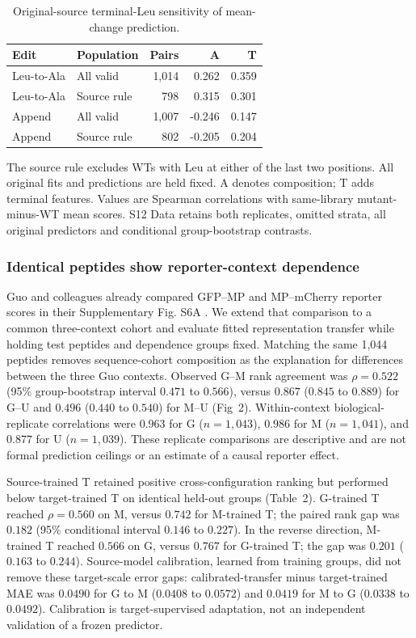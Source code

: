 \documentclass[11pt,a4paper]{article}
\begin{document}
\begin{table}[H]
\centering\small
\caption{Original-source terminal-Leu sensitivity of mean-change prediction.}
\label{tab:sourcefilter}
\begin{tabular}{llrrr}
\toprule
Edit & Population & Pairs & A & T\\
\midrule
Leu-to-Ala & All valid & 1,014 & 0.262 & 0.359\\
Leu-to-Ala & Source rule & 798 & 0.315 & 0.301\\
Append & All valid & 1,007 & -0.246 & 0.147\\
Append & Source rule & 802 & -0.205 & 0.204\\
\bottomrule
\end{tabular}
\par\smallskip\raggedright\footnotesize
The source rule excludes WTs with Leu at either of the last two positions.
All original fits and predictions are held fixed. A denotes composition;
T adds terminal features. Values are Spearman correlations with same-library
mutant-minus-WT mean scores. S12 Data retains both replicates, omitted strata,
all original predictors and conditional group-bootstrap contrasts.
\end{table}

\subsubsection{Identical peptides show reporter-context dependence}
Guo and colleagues already compared GFP--MP and MP--mCherry reporter
scores in their Supplementary Fig. S6A \cite{guo}. We extend that comparison
to a common three-context cohort and evaluate fitted representation transfer
while holding test peptides and dependence groups fixed.
Matching the same 1,044 peptides removes sequence-cohort composition as the
explanation for differences between the three Guo contexts. Observed
G--M rank agreement was $\rho=0.522$ (95\% group-bootstrap interval
$0.471$ to $0.566$), versus $0.867$ ($0.845$ to $0.889$) for G--U and
$0.496$ ($0.440$ to $0.540$) for M--U (Fig~2).
Within-context biological-replicate correlations were $0.963$ for G
($n=1,043$), $0.986$ for M ($n=1,041$), and $0.877$ for U ($n=1,039$).
These replicate comparisons are descriptive and are not formal prediction
ceilings or an estimate of a causal reporter effect.

Source-trained T retained positive cross-configuration ranking but performed
below target-trained T on identical held-out groups
(Table~2). G-trained T reached $\rho=0.560$ on M,
versus $0.742$ for M-trained T; the paired rank gap was $0.182$
(95\% conditional interval $0.146$ to $0.227$). In the reverse direction,
M-trained T reached $0.566$ on G, versus $0.767$ for G-trained T;
the gap was $0.201$ ($0.163$ to $0.244$). Source-model calibration,
learned from training groups, did not remove these target-scale error gaps:
calibrated-transfer minus target-trained MAE was $0.0490$ for G to M
($0.0408$ to $0.0572$) and $0.0419$ for M to G
($0.0338$ to $0.0492$). Calibration is target-supervised adaptation,
not an independent validation of a frozen predictor.
\end{document}
